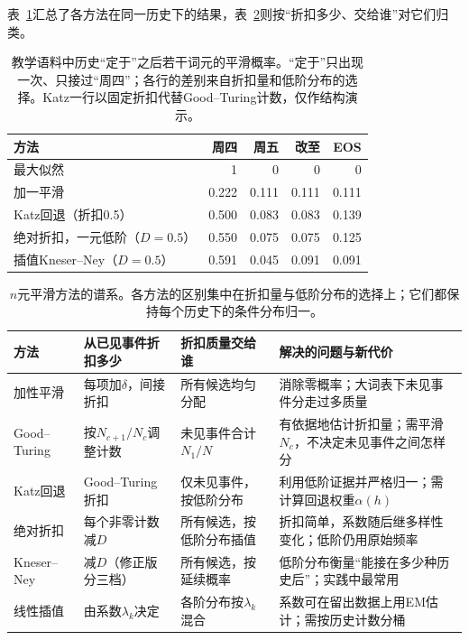 表~\ref{tab:nlp-classical-smoothing-example}汇总了各方法在同一历史下的结果，表~\ref{tab:nlp-classical-smoothing-methods}则按“折扣多少、交给谁”对它们归类。

\begin{table}[htbp]
  \centering
  \begin{tabular}{@{}lrrrr@{}}
    \toprule
    方法 & 周四 & 周五 & 改至 & EOS\\
    \midrule
    最大似然 & 1 & 0 & 0 & 0\\
    加一平滑 & 0.222 & 0.111 & 0.111 & 0.111\\
    Katz回退（折扣0.5） & 0.500 & 0.083 & 0.083 & 0.139\\
    绝对折扣，一元低阶（$D=0.5$） & 0.550 & 0.075 & 0.075 & 0.125\\
    插值Kneser--Ney（$D=0.5$） & 0.591 & 0.045 & 0.091 & 0.091\\
    \bottomrule
  \end{tabular}
  \caption{教学语料中历史“定于”之后若干词元的平滑概率。“定于”只出现一次、只接过“周四”；各行的差别来自折扣量和低阶分布的选择。Katz一行以固定折扣代替Good--Turing计数，仅作结构演示。}
  \label{tab:nlp-classical-smoothing-example}
\end{table}

\begin{table}[htbp]
  \begin{tabularx}{\linewidth}{@{}>{\raggedright\arraybackslash}p{27mm}>{\raggedright\arraybackslash}p{36mm}>{\raggedright\arraybackslash}p{38mm}>{\raggedright\arraybackslash}X@{}}
    \toprule
    方法 & 从已见事件折扣多少 & 折扣质量交给谁 & 解决的问题与新代价\\
    \midrule
    加性平滑 & 每项加$\delta$，间接折扣 & 所有候选均匀分配 & 消除零概率；大词表下未见事件分走过多质量\\
    Good--Turing & 按$N_{c+1}/N_c$调整计数 & 未见事件合计$N_1/N$ & 有依据地估计折扣量；需平滑$N_c$，不决定未见事件之间怎样分\\
    Katz回退 & Good--Turing折扣 & 仅未见事件，按低阶分布 & 利用低阶证据并严格归一；需计算回退权重$\alpha(h)$\\
    绝对折扣 & 每个非零计数减$D$ & 所有候选，按低阶分布插值 & 折扣简单，系数随后继多样性变化；低阶仍用原始频率\\
    Kneser--Ney & 减$D$（修正版分三档） & 所有候选，按延续概率 & 低阶分布衡量“能接在多少种历史后”；实践中最常用\\
    线性插值 & 由系数$\lambda_k$决定 & 各阶分布按$\lambda_k$混合 & 系数可在留出数据上用EM估计；需按历史计数分桶\\
    \bottomrule
  \end{tabularx}
  \caption{$n$元平滑方法的谱系。各方法的区别集中在折扣量与低阶分布的选择上；它们都保持每个历史下的条件分布归一。}
  \label{tab:nlp-classical-smoothing-methods}
\end{table}

